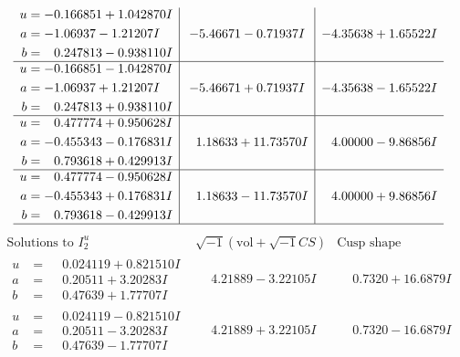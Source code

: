 \documentclass[1p]{elsarticle_modified}
\theoremstyle{definition}
\newcommand{\I}{\sqrt{-1}}
\begin{document}
$$\begin{array}{c|c|c}
\begin{aligned}
u &= -0.166851 + 1.042870 I \\
a &= -1.06937 - 1.21207 I \\
b &= \phantom{-}0.247813 - 0.938110 I\end{aligned}
 & -5.46671 - 0.71937 I & -4.35638 + 1.65522 I \\ \hline\begin{aligned}
u &= -0.166851 - 1.042870 I \\
a &= -1.06937 + 1.21207 I \\
b &= \phantom{-}0.247813 + 0.938110 I\end{aligned}
 & -5.46671 + 0.71937 I & -4.35638 - 1.65522 I \\ \hline\begin{aligned}
u &= \phantom{-}0.477774 + 0.950628 I \\
a &= -0.455343 - 0.176831 I \\
b &= \phantom{-}0.793618 + 0.429913 I\end{aligned}
 & \phantom{-}1.18633 + 11.73570 I & \phantom{-}4.00000 - 9.86856 I \\ \hline\begin{aligned}
u &= \phantom{-}0.477774 - 0.950628 I \\
a &= -0.455343 + 0.176831 I \\
b &= \phantom{-}0.793618 - 0.429913 I\end{aligned}
 & \phantom{-}1.18633 - 11.73570 I & \phantom{-}4.00000 + 9.86856 I\\
 \hline 
 \end{array}$$\newpage$$\begin{array}{c|c|c}  
\text{Solutions to }I^u_{2}& \I (\text{vol} + \sqrt{-1}CS) & \text{Cusp shape}\\
 \hline 
\begin{aligned}
u &= \phantom{-}0.024119 + 0.821510 I \\
a &= \phantom{-}0.20511 + 3.20283 I \\
b &= \phantom{-}0.47639 + 1.77707 I\end{aligned}
 & \phantom{-}4.21889 - 3.22105 I & \phantom{-}0.7320 + 16.6879 I \\ \hline\begin{aligned}
u &= \phantom{-}0.024119 - 0.821510 I \\
a &= \phantom{-}0.20511 - 3.20283 I \\
b &= \phantom{-}0.47639 - 1.77707 I\end{aligned}
 & \phantom{-}4.21889 + 3.22105 I & \phantom{-}0.7320 - 16.6879 I \\ \hline\begin{aligned}

\end{aligned}
\end{array}$$
\end{document}
